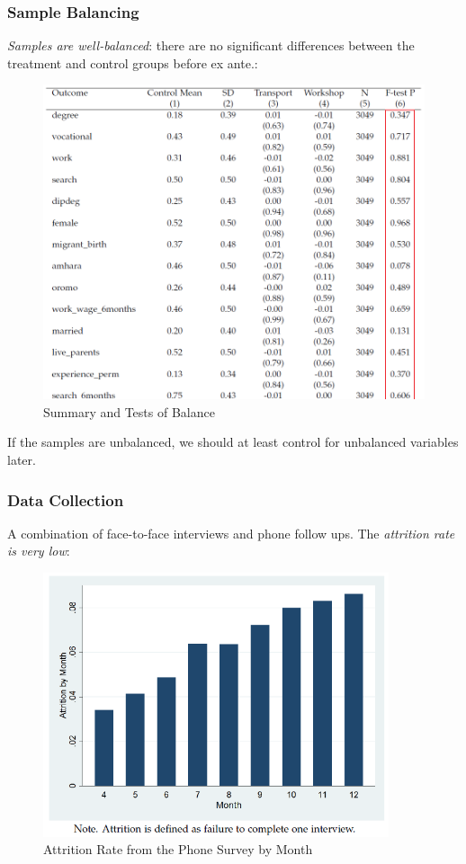         \subsubsection{Sample Balancing}
            \emph{Samples are well-balanced}: there are no significant differences between the treatment and control groups before ex ante.:
            \begin{figure}[H]
                \centering
                \includegraphics[width=5in]{images/ch6/Abebe balancing.png}
                \caption{Summary and Tests of Balance}
            \end{figure}
            If the samples are unbalanced, we should at least control for unbalanced variables later.
            
        \subsubsection{Data Collection}
            A combination of face-to-face interviews and phone follow ups. The \emph{attrition rate is very low}:
            \begin{figure}[H]
                \centering
                \includegraphics[width=4in]{images/ch6/Abebe attrition.png}
                \caption{Attrition Rate from the Phone Survey by Month}
            \end{figure}

